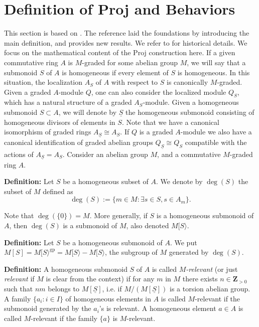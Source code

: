 \documentclass[graybox]{svmult}
\begin{document}
\section{Definition of Proj and Behaviors}
This section is based on \cite{BS03, MR24}. The reference \cite{BS03} laid the foundations by introducing the main definition, and \cite{Ma24} provides new results.  We refer to \cite{Ma24} for historical details. We focus on the mathematical content of the Proj construction here.
If a given commutative ring $A$ is $M$-graded for some abelian group $M$, we will say that a submonoid $S$ of $A$ is homogeneous if every element of $S$ is homogeneous. 
In this situation, the localization $A_S$ of $A$ with respect to $S$ is canonically $M$-graded.
Given a graded $A$-module $Q$, one can also consider the localized module $Q_S$, which has a natural structure of a graded $A_S$-module.
Given a homogeneous submonoid $S \subset A$, we will denote by $\underline{S}$ the homogeneous submonoid consisting of homogeneous divisors of elements in $S$. Note that we have a canonical isomorphism of graded rings
 $A_{ \underline{S}} \cong A_{S}.
$
If $Q$ is a graded $A$-module we also have a canonical identification of graded abelian groups 
$
Q_{\underline{S}} \cong Q_S
$
compatible with the actions of $A_{ \underline{S}} = A_{S}$.
Consider an abelian group $M$, and a commutative $M$-graded ring $A$. 

\vspace{0.25\baselineskip}
\noindent \textbf{Definition:}
 Let $S$ be a homogeneous subset of $A$. We denote by $\deg(S)$ the subset of $M$ defined as 
\[\deg(S):= \{ m \in M : \exists s \in S , s  \in A_m \}. \]

 
Note that $\deg(\{0\})=M$.
More generally, if $S$ is a homogeneous submonoid of $A$, then $\deg(S)$ is a submonoid of $M$, also denoted $M[S\rangle$.

\vspace{0.25\baselineskip}
\noindent \textbf{{Definition:}}
Let $S$ be a homogeneous submonoid of $A$. 
 We put $M[S]=M[S \rangle^{\mathrm{gp}}= M[S \rangle- M[S \rangle$, the subgroup of $M$ generated by $\deg(S)$.


\vspace{0.25\baselineskip}
\noindent\textbf{{Definition:}}
 A homogeneous submonoid $S$ of $A$ is called \emph{$M$-relevant} (or just \emph{relevant} if $M$ is clear from the context) if for any $m$ in $M$ there exists $n \in \mathbf{Z}_{> 0}$ such that $nm$ belongs to $M[\underline{S}]$, i.e. if $M/(M[\underline{S}])$ is a torsion abelian group.
 A family $\{a_i : i \in I\}$ of homogeneous elements in $A$ is called $M$-relevant if the submonoid generated by the $a_i$'s is relevant.
 A homogeneous element $a \in A$ is called $M$-relevant if the family $\{a\}$ is $M$-relevant.
\end{document}

